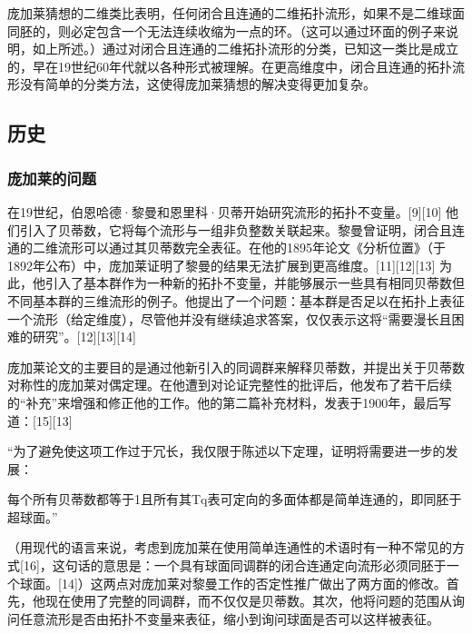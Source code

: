 庞加莱猜想的二维类比表明，任何闭合且连通的二维拓扑流形，如果不是二维球面同胚的，则必定包含一个无法连续收缩为一点的环。（这可以通过环面的例子来说明，如上所述。）通过对闭合且连通的二维拓扑流形的分类，已知这一类比是成立的，早在19世纪60年代就以各种形式被理解。在更高维度中，闭合且连通的拓扑流形没有简单的分类方法，这使得庞加莱猜想的解决变得更加复杂。
\subsection{历史}  
\subsubsection{庞加莱的问题}  
在19世纪，伯恩哈德·黎曼和恩里科·贝蒂开始研究流形的拓扑不变量。[9][10] 他们引入了贝蒂数，它将每个流形与一组非负整数关联起来。黎曼曾证明，闭合且连通的二维流形可以通过其贝蒂数完全表征。在他的1895年论文《分析位置》（于1892年公布）中，庞加莱证明了黎曼的结果无法扩展到更高维度。[11][12][13] 为此，他引入了基本群作为一种新的拓扑不变量，并能够展示一些具有相同贝蒂数但不同基本群的三维流形的例子。他提出了一个问题：基本群是否足以在拓扑上表征一个流形（给定维度），尽管他并没有继续追求答案，仅仅表示这将“需要漫长且困难的研究”。[12][13][14]

庞加莱论文的主要目的是通过他新引入的同调群来解释贝蒂数，并提出关于贝蒂数对称性的庞加莱对偶定理。在他遭到对论证完整性的批评后，他发布了若干后续的“补充”来增强和修正他的工作。他的第二篇补充材料，发表于1900年，最后写道：[15][13]

“为了避免使这项工作过于冗长，我仅限于陈述以下定理，证明将需要进一步的发展：

每个所有贝蒂数都等于1且所有其Tq表可定向的多面体都是简单连通的，即同胚于超球面。”

（用现代的语言来说，考虑到庞加莱在使用简单连通性的术语时有一种不常见的方式[16]，这句话的意思是：一个具有球面同调群的闭合连通定向流形必须同胚于一个球面。[14]）这两点对庞加莱对黎曼工作的否定性推广做出了两方面的修改。首先，他现在使用了完整的同调群，而不仅仅是贝蒂数。其次，他将问题的范围从询问任意流形是否由拓扑不变量来表征，缩小到询问球面是否可以这样被表征。

